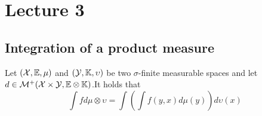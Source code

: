 \section{Lecture 3} %
\label{sec:lecture_3}
\subsection{Integration of a product measure} %
\label{sub:integration_of_a_product_measure}
\begin{them}
Let \(({\mathcal{X}},{\mathbb{E}},\mu)\) and \((\mathcal{Y},{\mathbb{K}},\upsilon)\) be two \(\sigma\)-finite measurable spaces and let \(d\in \mathcal{M}^+({\mathcal{X}}\times\mathcal{Y},{\mathbb{E}}\otimes{\mathbb{K}})\).It holds that
\[
  \int fd\mu\otimes \upsilon=\int\left(\int f(y,x)d\mu(y)\right)d\upsilon(x)
\]

\end{them}

